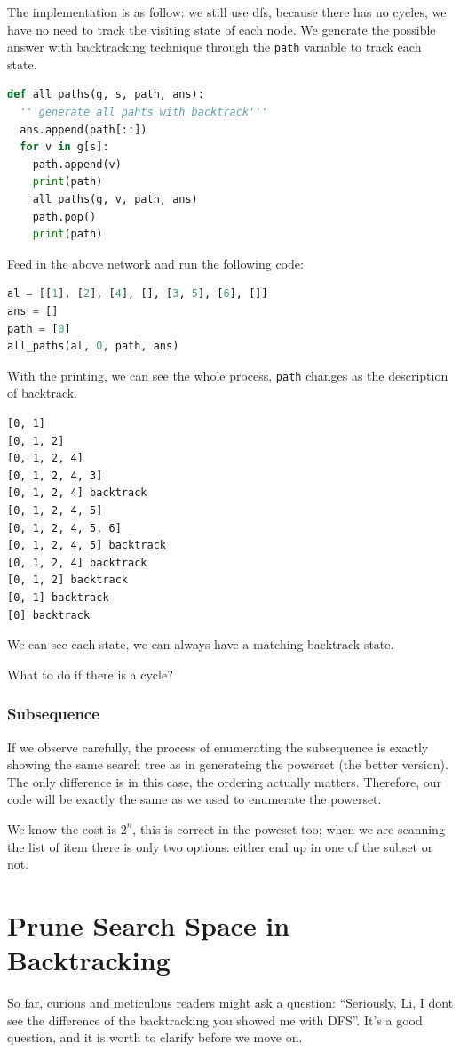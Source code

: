 \documentclass[../main.tex]{subfiles}
\begin{document}
The implementation is as follow: we still use dfs, because there has no cycles, we have no need to track the visiting state of each node. We generate the possible answer with backtracking technique through the \texttt{path} variable to track each state. 
\begin{lstlisting}[language=Python]
def all_paths(g, s, path, ans):
  '''generate all pahts with backtrack'''
  ans.append(path[::])
  for v in g[s]:
    path.append(v)
    print(path)
    all_paths(g, v, path, ans)
    path.pop()
    print(path)
\end{lstlisting}
Feed in the above network and run the following code:
\begin{lstlisting}[language=Python]
al = [[1], [2], [4], [], [3, 5], [6], []]
ans = []
path = [0]
all_paths(al, 0, path, ans)
\end{lstlisting}
With the printing, we can see the whole process, \texttt{path} changes as the description of backtrack. \begin{lstlisting}[numbers=none]
[0, 1]
[0, 1, 2]
[0, 1, 2, 4]
[0, 1, 2, 4, 3]
[0, 1, 2, 4] backtrack
[0, 1, 2, 4, 5]
[0, 1, 2, 4, 5, 6]
[0, 1, 2, 4, 5] backtrack
[0, 1, 2, 4] backtrack
[0, 1, 2] backtrack
[0, 1] backtrack
[0] backtrack
\end{lstlisting}
We can see each state, we can always have a matching backtrack state. 
\begin{bclogo}[couleur = blue!30, arrondi=0.1,logo=\bccrayon,ombre=true]{What to do if there is a cycle?} 
\end{bclogo}
\subsubsection{Subsequence}
If we observe carefully, the process of enumerating the subsequence is exactly showing the same search tree as in generateing the powerset (the better version). The only difference is in this case, the ordering actually matters. Therefore, our code will be exactly the same as we used to enumerate the powerset. 

We know the cost is $2^n$,  this is correct in the poweset too; when we are scanning the list of item there is only two options: either end up in one of the subset or not. 

\section{Prune Search Space in Backtracking}
\label{chapter_combinatorics_backtracking_csp}
So far, curious and meticulous readers might ask a question: ``Seriously, Li, I dont see the difference of the backtracking you showed me with DFS''. It's a good question, and it is worth to clarify before we move on.
\end{document}
